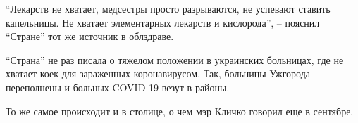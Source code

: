 \enquote{Лекарств не хватает, медсестры просто разрываются, не успевают ставить
капельницы. Не хватает элементарных лекарств и кислорода}, – пояснил
\enquote{Стране} тот же источник в облздраве.

\enquote{Страна} не раз писала о тяжелом положении в украинских больницах, где
не хватает коек для зараженных коронавирусом. Так, больницы Ужгорода
переполнены и больных COVID-19 везут в районы.

То же самое происходит и в столице, о чем мэр Кличко говорил еще в сентябре.
